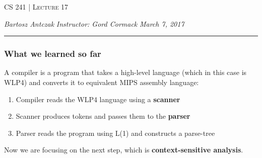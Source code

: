 \documentclass{report}
\newcommand{\lectureNum}{17}
\newcommand{\curDate}{March 7, 2017}
\newcommand{\course}{CS 241}
\newcommand{\instructor}{Gord Cormack}
\begin{document}
\begin{center}
\begin{Large}
\textsc{\course{} | Lecture \lectureNum{}}
\end{Large}
\end{center} 
\noindent \textit{Bartosz Antczak} \hfill
\textit{Instructor: \instructor{}} \hfill
\textit{\curDate{}}
\rule{\textwidth}{0.4pt}
\subsubsection{What we learned so far}
A compiler is a program that takes a high-level language (which in this case is WLP4) and converts it to equivalent MIPS assembly language:
\begin{enumerate}
\item Compiler reads the WLP4 language using a \textbf{scanner}
\item Scanner produces tokens and passes them to the \textbf{parser}
\item Parser reads the program using L(1) and constructs a parse-tree
\end{enumerate}
Now we are focusing on the next step, which is \textbf{context-sensitive analysis}.
\end{document}
